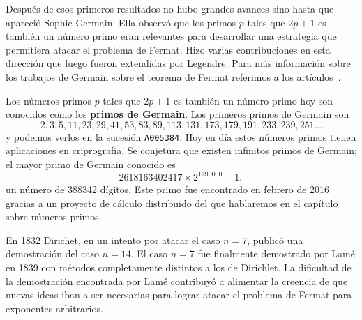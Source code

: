 
Después de esos primeros resultados no hubo grandes avances sino hasta que
apareció Sophie Germain. Ella observó que los primos $p$ tales que $2p+1$ es
también un número primo eran relevantes para desarrollar una estrategia que
permitiera atacar el problema de Fermat.  Hizo varias contribuciones en esta
dirección que luego fueron extendidas por Legendre. Para más información sobre
los trabajos de Germain sobre el teorema de Fermat referimos a los
artículos~\cite{MR2415091,MR2735899}.

Los números primos $p$ tales que $2p+1$ es también un número primo hoy son
conocidos como los \textbf{primos de Germain}. Los primeros primos de Germain
son
\[
	2, 3, 5, 11, 23, 29, 41, 53, 83, 89, 113, 131, 173, 179, 191, 233, 239,
	251\dots
\]
y podemos verlos en la sucesión \verb+A005384+. Hoy en día estos números primos
tienen aplicaciones en criprografía. Se conjetura que existen infinitos primos
de Germain; el mayor primo de Germain conocido es 
\[
	2618163402417\times 2^{1290000} - 1,
\]
un número de 388342 dígitos. Este primo fue encontrado en febrero de 2016
gracias a un proyecto de cálculo distribuido del que hablaremos en el capítulo
sobre números primos. 

En 1832 Dirichet, en un intento por atacar el caso $n=7$, publicó una
demostración del caso $n=14$. El caso $n=7$ fue finalmente demostrado por Lamé
en 1839 con métodos completamente distintos a los de Dirichlet. La dificultad
de la demostración encontrada por Lamé contribuyó a alimentar la creencia de
que nuevas ideas iban a ser necesarias para lograr atacar el problema de Fermat
para exponentes arbitrarios. 

